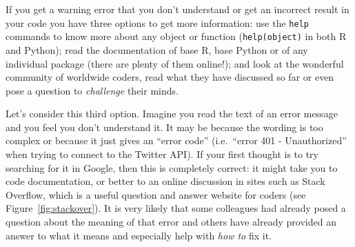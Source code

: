 

If you get a warning error that you don't understand or get an incorrect result in your code you have three options to get more information: use the \texttt{help} commands to know more about any object or function (\verb|help(object)| in both R and  Python); read the documentation of base R, base Python or of any individual package (there are plenty of them online!); and look at the wonderful community of worldwide coders, read what they have discussed so far or even pose a question to \textit{challenge} their minds.

Let's consider this third option. Imagine you read the text of an error message and you feel you don't understand it.
It may be because the wording is too complex or because it just gives an ``error code''
(i.e.\ ``error 401 - Unauthorized'' when trying to connect to the Twitter API).
If your first thought is to try searching for it in Google, then this is completely correct:
it might take you to code documentation, or better to an online discussion in sites such as Stack Overflow,
which is a useful question and answer website for coders (see Figure~\ref{fig:stackover}).
It is very likely that some colleagues had already posed a question about the meaning of that error
and others have already provided an answer to what it means and especially help with \textit{how to} fix it.

